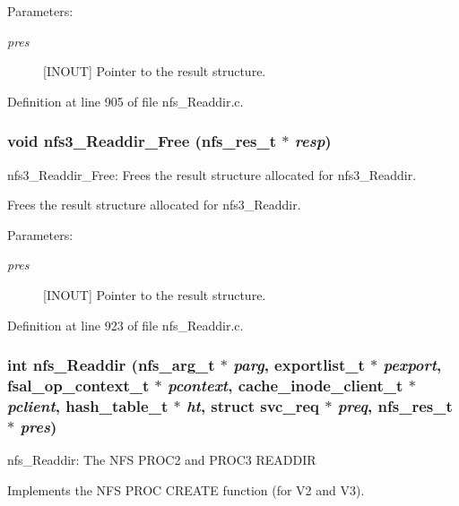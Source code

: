 \begin{Desc}
\item[Parameters:]
\begin{description}
\item[{\em pres}][INOUT] Pointer to the result structure. \end{description}
\end{Desc}


Definition at line 905 of file nfs\_\-Readdir.c.
\subsubsection{\setlength{\rightskip}{0pt plus 5cm}void nfs3\_\-Readdir\_\-Free (nfs\_\-res\_\-t $\ast$ {\em resp})}\label{nfs__Readdir_8c_a5}


nfs3\_\-Readdir\_\-Free: Frees the result structure allocated for nfs3\_\-Readdir.

Frees the result structure allocated for nfs3\_\-Readdir.

\begin{Desc}
\item[Parameters:]
\begin{description}
\item[{\em pres}][INOUT] Pointer to the result structure. \end{description}
\end{Desc}


Definition at line 923 of file nfs\_\-Readdir.c.
\subsubsection{\setlength{\rightskip}{0pt plus 5cm}int nfs\_\-Readdir (nfs\_\-arg\_\-t $\ast$ {\em parg}, exportlist\_\-t $\ast$ {\em pexport}, fsal\_\-op\_\-context\_\-t $\ast$ {\em pcontext}, cache\_\-inode\_\-client\_\-t $\ast$ {\em pclient}, hash\_\-table\_\-t $\ast$ {\em ht}, struct svc\_\-req $\ast$ {\em preq}, nfs\_\-res\_\-t $\ast$ {\em pres})}\label{nfs__Readdir_8c_a3}


nfs\_\-Readdir: The NFS PROC2 and PROC3 READDIR

Implements the NFS PROC CREATE function (for V2 and V3).

